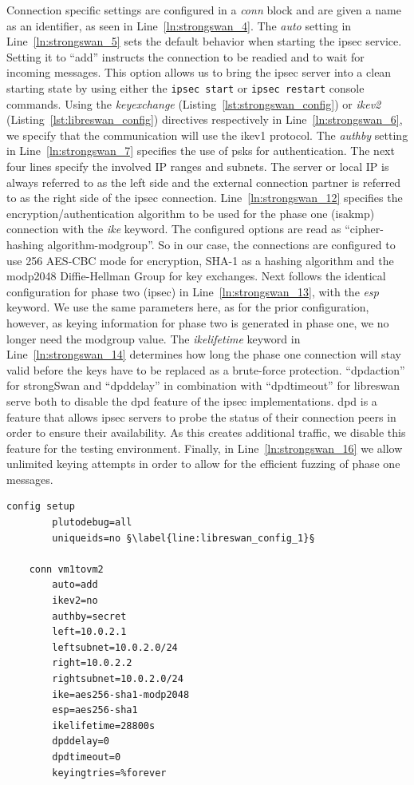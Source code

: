 Connection specific settings are configured in a \emph{conn} block and are given a name as an identifier, as seen in Line~\ref{ln:strongswan_4}. The \emph{auto} setting in Line~\ref{ln:strongswan_5} sets the default behavior when starting the \ac{ipsec} service. Setting it to ``add'' instructs the connection to be readied and to wait for incoming messages. This option allows us to bring the \ac{ipsec} server into a clean starting state by using either the \texttt{ipsec start} or \texttt{ipsec restart} console commands. Using the \emph{keyexchange} (Listing~\ref{lst:strongswan_config}) or 
\emph{ikev2} (Listing~\ref{lst:libreswan_config}) directives respectively in Line~\ref{ln:strongswan_6}, we specify that the communication will use the \ac{ike}v1 protocol. The \emph{authby} setting in Line~\ref{ln:strongswan_7} specifies the use of \acp{psk} for authentication. The next four lines specify the involved IP ranges and subnets. The server or local IP is always referred to as the left side and the external connection partner is referred to as the right side of the \ac{ipsec} connection. Line~\ref{ln:strongswan_12} specifies the encryption/authentication algorithm to be used for the phase one (\ac{isakmp}) connection with the \emph{ike} keyword. The configured options are read as ``cipher-hashing algorithm-modgroup''. So in our case, the connections are configured to use \SI{256}{\bit} AES-CBC mode for encryption, SHA-1 as a hashing algorithm and the modp2048 Diffie-Hellman Group for key exchanges. Next follows the identical configuration for phase two (\ac{ipsec}) in Line~\ref{ln:strongswan_13}, with the \emph{esp} keyword. We use the same parameters here, as for the prior configuration, however, as keying information for phase two is generated in phase one, we no longer need the modgroup value. The \emph{ikelifetime} keyword in Line~\ref{ln:strongswan_14} determines how long the phase one connection will stay valid before the keys have to be replaced as a brute-force protection. ``dpdaction'' for strongSwan and ``dpddelay'' in combination with ``dpdtimeout'' for libreswan serve both to disable the \ac{dpd} feature of the \ac{ipsec} implementations. \ac{dpd} is a feature that allows \ac{ipsec} servers to probe the status of their connection peers in order to ensure their availability. As this creates additional traffic, we disable this feature for the testing environment. Finally, in Line~\ref{ln:strongswan_16} we allow unlimited keying attempts in order to allow for the efficient fuzzing of phase one messages.

\begin{lstlisting}[mathescape=true, float=ht, caption=Configuration options of the libreswan server., label=lst:libreswan_config, escapechar=§]
	config setup
		plutodebug=all
		uniqueids=no §\label{line:libreswan_config_1}§
	
	conn vm1tovm2
		auto=add
		ikev2=no
		authby=secret
		left=10.0.2.1 
		leftsubnet=10.0.2.0/24
		right=10.0.2.2
		rightsubnet=10.0.2.0/24
		ike=aes256-sha1-modp2048
		esp=aes256-sha1
		ikelifetime=28800s
		dpddelay=0
		dpdtimeout=0
		keyingtries=%forever
\end{lstlisting}


